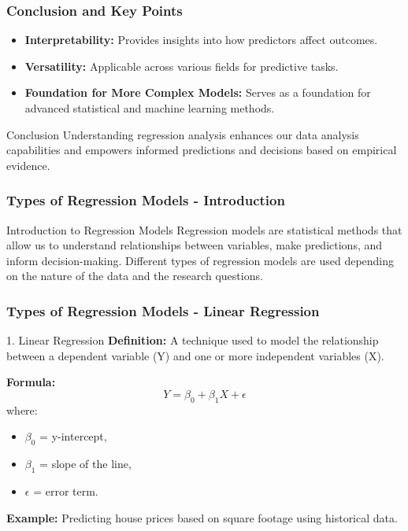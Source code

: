 \documentclass{beamer}
\begin{document}
\begin{frame}[fragile]
    \frametitle{Conclusion and Key Points}
    \begin{itemize}
        \item \textbf{Interpretability:} Provides insights into how predictors affect outcomes.
        \item \textbf{Versatility:} Applicable across various fields for predictive tasks.
        \item \textbf{Foundation for More Complex Models:} Serves as a foundation for advanced statistical and machine learning methods.
    \end{itemize}
    
    \begin{block}{Conclusion}
        Understanding regression analysis enhances our data analysis capabilities and empowers informed predictions and decisions based on empirical evidence.
    \end{block}
\end{frame}

\begin{frame}[fragile]
    \frametitle{Types of Regression Models - Introduction}
    \begin{block}{Introduction to Regression Models}
        Regression models are statistical methods that allow us to understand relationships between variables, make predictions, and inform decision-making. 
        Different types of regression models are used depending on the nature of the data and the research questions.
    \end{block}
\end{frame}

\begin{frame}[fragile]
    \frametitle{Types of Regression Models - Linear Regression}
    \begin{block}{1. Linear Regression}
        \textbf{Definition:} A technique used to model the relationship between a dependent variable (Y) and one or more independent variables (X).
        
        \textbf{Formula:}
        \begin{equation}
        Y = \beta_0 + \beta_1 X + \epsilon
        \end{equation}
        where:
        \begin{itemize}
            \item \( \beta_0 \) = y-intercept,
            \item \( \beta_1 \) = slope of the line,
            \item \( \epsilon \) = error term.
        \end{itemize}
        
        \textbf{Example:} Predicting house prices based on square footage using historical data.
    \end{block}
\end{frame}
\end{document}
